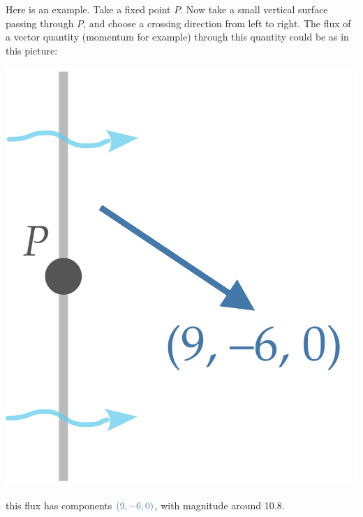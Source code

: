 \documentclass[a4paper,12pt,%
onecolumn,oneside,%
british%
]{memoir}
\providecommand{\href}[2]{#2}
\renewcommand*{\|}[1][]{\nonscript\:#1\vert\nonscript\:\mathopen{}}
\newcommand*{\furl}[2]{\href{#1}{#2}\pagenote{\url{#1}}}
\begin{document}
Here is an example. Take a fixed point $P$. Now take a small vertical surface passing through $P$, and choose a crossing direction from left to right. The flux of a vector quantity (momentum for example) through this quantity could be as in this picture:
\begin{center}
  \includegraphics[align=c,scale=0.08]{images/skewfluxPx.pdf}
\end{center}
this flux has components $\mathcolor{blue}{(9,-6,0)}$, with magnitude around \num{10.8}.
\end{document}
